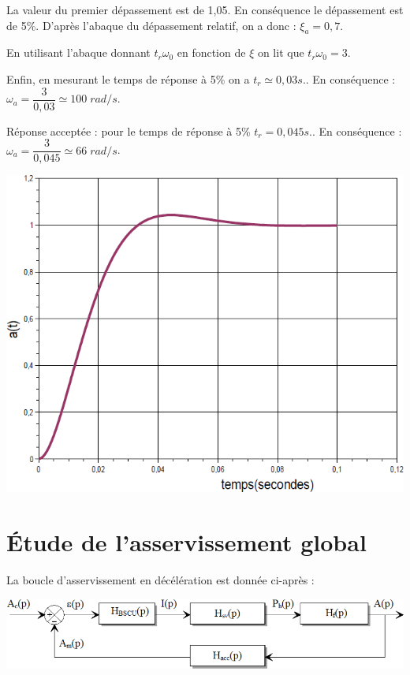 \documentclass[10pt,fleqn]{article} %
\begin{document}
\begin{multicols}{2}
\begin{corrige}
La valeur du premier dépassement est de 1,05. En conséquence le dépassement est
de 5\%. D'après l'abaque du dépassement relatif, on a donc : $\xi_a=0,7$. 

En utilisant l'abaque donnant $t_r \omega_0$ en fonction de $\xi$ on lit que 
$t_r \omega_0 = 3$. 


Enfin, en mesurant le temps de réponse à 5\% on a $t_r \simeq 0,03 s.$. En
conséquence : $\omega_a = \dfrac{3}{0,03}\simeq 100 \; rad/s$.

Réponse acceptée : pour le temps de réponse à 5\% $t_r = 0,045 s.$. En
conséquence : $\omega_a = \dfrac{3}{0,045}\simeq 66\;  rad/s$.

\end{corrige}
\else
\fi



\ifprof
\else
\begin{center}
\includegraphics[width=.8\linewidth]{images/image15.png}
\end{center}
\fi

\section*{Étude de l'asservissement global}
\ifprof
\else
La boucle d'asservissement en décélération est donnée ci-après :

\begin{center}
\includegraphics[width=.8\linewidth]{images/image16.png}
\end{center}


\end{multicols}
\end{document}
